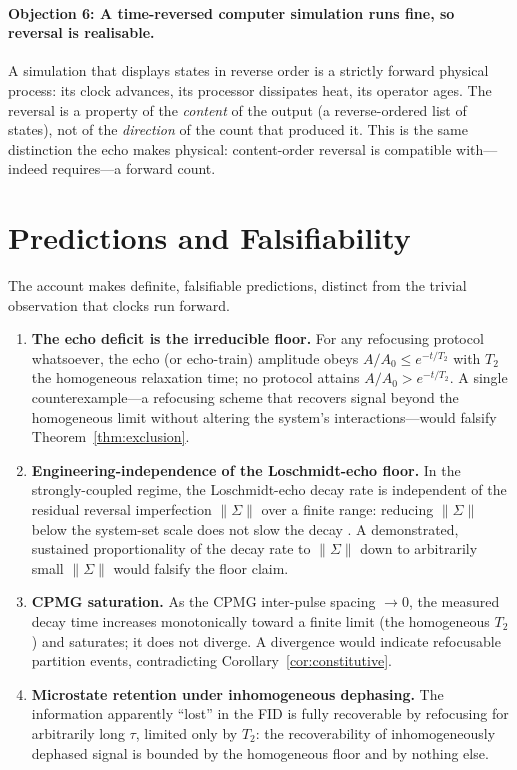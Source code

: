 \documentclass[11pt,a4paper]{article}
\theoremstyle{thmstyle}
\theoremstyle{definition}
\theoremstyle{remark}
\newcommand{\Ttwo}{T_{2}}
\begin{document}
\paragraph{Objection 6: A time-reversed computer simulation runs fine, so
reversal is realisable.} A simulation that displays states in reverse
order is a strictly forward physical process: its clock advances, its
processor dissipates heat, its operator ages. The reversal is a property
of the \emph{content} of the output (a reverse-ordered list of states),
not of the \emph{direction} of the count that produced it. This is the
same distinction the echo makes physical: content-order reversal is
compatible with---indeed requires---a forward count.

\section{Predictions and Falsifiability}
\label{sec:predictions}

The account makes definite, falsifiable predictions, distinct from the
trivial observation that clocks run forward.

\begin{enumerate}[leftmargin=1.5em,itemsep=0.3em]
\item \textbf{The echo deficit is the irreducible floor.} For any
refocusing protocol whatsoever, the echo (or echo-train) amplitude obeys
$A/A_{0}\le e^{-t/\Ttwo}$ with $\Ttwo$ the homogeneous relaxation time;
no protocol attains $A/A_{0}>e^{-t/\Ttwo}$. A single counterexample---a
refocusing scheme that recovers signal beyond the homogeneous limit
without altering the system's interactions---would falsify
Theorem~\ref{thm:exclusion}.

\item \textbf{Engineering-independence of the Loschmidt-echo floor.} In
the strongly-coupled regime, the Loschmidt-echo decay rate is independent
of the residual reversal imperfection $\|\Sigma\|$ over a finite range:
reducing $\|\Sigma\|$ below the system-set scale does not slow the decay
\citep{jalabert2001}. A demonstrated, sustained proportionality of the
decay rate to $\|\Sigma\|$ down to arbitrarily small $\|\Sigma\|$ would
falsify the floor claim.

\item \textbf{CPMG saturation.} As the CPMG inter-pulse spacing
$\to 0$, the measured decay time increases monotonically toward a finite
limit (the homogeneous $\Ttwo$) and saturates; it does not diverge. A
divergence would indicate refocusable partition events, contradicting
Corollary~\ref{cor:constitutive}.

\item \textbf{Microstate retention under inhomogeneous dephasing.} The
information apparently ``lost'' in the FID is fully recoverable by
refocusing for arbitrarily long $\tau$, limited only by $\Ttwo$: the
recoverability of inhomogeneously dephased signal is bounded by the
homogeneous floor and by nothing else.
\end{enumerate}
\end{document}
